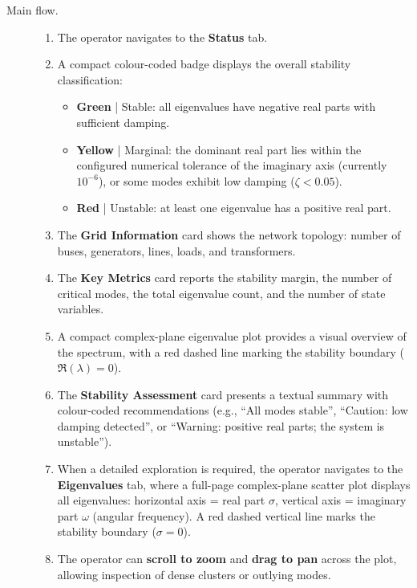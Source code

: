 \begin{description}
  \item[Main flow.]
        \begin{enumerate}[before=\leavevmode, leftmargin=*]
          \item The operator navigates to the \textbf{Status} tab.
          \item A compact colour-coded badge displays the overall stability classification:
                \begin{itemize}[before=\leavevmode, leftmargin=*]
                  \item \textbf{Green} | Stable: all eigenvalues have negative real parts with sufficient damping.
                  \item \textbf{Yellow} | Marginal: the dominant real part lies within the configured numerical tolerance of the imaginary axis (currently $10^{-6}$), or some modes exhibit low damping ($\zeta < 0.05$).
                  \item \textbf{Red} | Unstable: at least one eigenvalue has a positive real part.
                \end{itemize}
          \item The \textbf{Grid Information} card shows the network topology: number of buses, generators, lines, loads, and transformers.
          \item The \textbf{Key Metrics} card reports the stability margin, the number of critical modes, the total eigenvalue count, and the number of state variables.
          \item A compact complex-plane eigenvalue plot provides a visual overview of the spectrum, with a red dashed line marking the stability boundary ($\Re(\lambda) = 0$).
          \item The \textbf{Stability Assessment} card presents a textual summary with colour-coded recommendations (e.g., ``All modes stable'', ``Caution: low damping detected'', or ``Warning: positive real parts; the system is unstable'').
          \item When a detailed exploration is required, the operator navigates to the \textbf{Eigenvalues} tab, where a full-page complex-plane scatter plot displays all eigenvalues: horizontal axis = real part $\sigma$, vertical axis = imaginary part $\omega$ (angular frequency). A red dashed vertical line marks the stability boundary ($\sigma = 0$).
          \item The operator can \textbf{scroll to zoom} and \textbf{drag to pan} across the plot, allowing inspection of dense clusters or outlying modes.

\end{enumerate}
\end{description}
